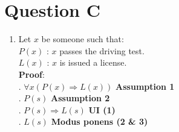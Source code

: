 \documentclass[a4paper]{article}
\begin{document}
\newpage
\section{Question C}

\setlength{\parindent}{5ex}

\begin{enumerate}
\setlength{\parindent}{5ex}
\item \indent\indent Let \(x\) be someone such that:\\
\vspace{1mm}
\indent\indent \(P(x)\) : \(x\) passes the driving test.\\
\indent\indent \(L(x)\) : \(x\) is issued a license.\\
\vspace{2mm}
\indent\indent \textbf{Proof}:\\
\vspace{2mm}
\indent{}. \( \forall x (P(x) \Rightarrow L(x))\) \hfill \textbf{Assumption 1}\\
\indent{}. \(P(s)\) \hfill \textbf{Assumption 2}\\
\indent{}. \(P(s) \Rightarrow L(s)\) \hfill \textbf{UI (1)}\\
\indent{}. \(L(s)\) \hfill \textbf{Modus ponens (2 \& 3)}\\

\vspace{5mm}


\end{enumerate}
\end{document}
